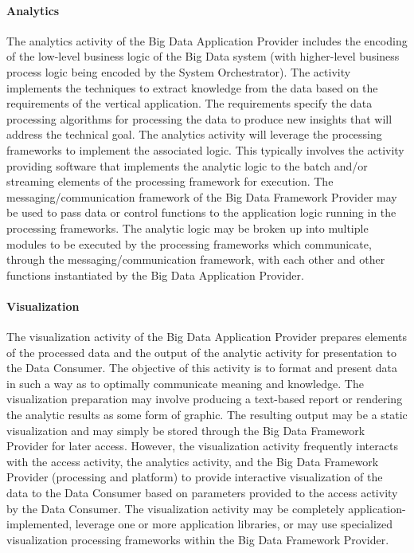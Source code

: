 \documentclass[10pt]{article}
\begin{document}
\paragraph{Analytics}

The analytics activity of the Big Data Application Provider includes the encoding of the low-level business logic of the Big Data system (with higher-level business process logic being encoded by the System Orchestrator). The activity implements the techniques to extract knowledge from the data based on the requirements of the vertical application. The requirements specify the data processing algorithms for processing the data to produce new insights that will address the technical goal. The analytics activity will leverage the processing frameworks to implement the associated logic. This typically involves the activity providing software that implements the analytic logic to the batch and/or streaming elements of the processing framework for execution. The messaging/communication framework of the Big Data Framework Provider may be used to pass data or control functions to the application logic running in the processing frameworks. The analytic logic may be broken up into multiple modules to be executed by the processing frameworks which communicate, through the messaging/communication framework, with each other and other functions instantiated by the Big Data Application Provider.

\paragraph{Visualization}

The visualization activity of the Big Data Application Provider prepares elements of the processed data and the output of the analytic activity for presentation to the Data Consumer. The objective of this activity is to format and present data in such a way as to optimally communicate meaning and knowledge. The visualization preparation may involve producing a text-based report or rendering the analytic results as some form of graphic. The resulting output may be a static visualization and may simply be stored through the Big Data Framework Provider for later access. However, the visualization activity frequently interacts with the access activity, the analytics activity, and the Big Data Framework Provider (processing and platform) to provide interactive visualization of the data to the Data Consumer based on parameters provided to the access activity by the Data Consumer. The visualization activity may be completely application-implemented, leverage one or more application libraries, or may use specialized visualization processing frameworks within the Big Data Framework Provider. 
\end{document}
